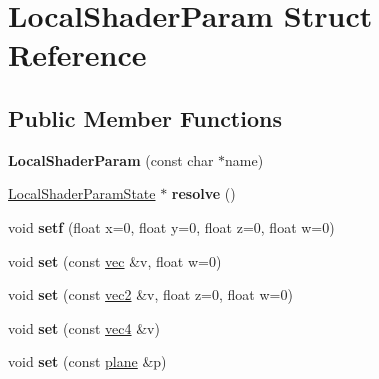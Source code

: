 \hypertarget{struct_local_shader_param}{}\section{Local\+Shader\+Param Struct Reference}
\label{struct_local_shader_param}
\subsection*{Public Member Functions}
\begin{DoxyCompactItemize}
\item 
\mbox{\label{struct_local_shader_param_a1acdf1fcdef3d9c7f2fe238dcda4db07}} 
{\bfseries Local\+Shader\+Param} (const char $\ast$name)
\item 
\mbox{\label{struct_local_shader_param_a43b2c7c2c7a174fc2c4a3f5ba18cc114}} 
\hyperlink{struct_local_shader_param_state}{Local\+Shader\+Param\+State} $\ast$ {\bfseries resolve} ()
\item 
\mbox{\label{struct_local_shader_param_ada3322bb528ea4f4e191c9e42602cecd}} 
void {\bfseries setf} (float x=0, float y=0, float z=0, float w=0)
\item 
\mbox{\label{struct_local_shader_param_aab97027a7f88630ebf8e0127286b0299}} 
void {\bfseries set} (const \hyperlink{structvec}{vec} \&v, float w=0)
\item 
\mbox{\label{struct_local_shader_param_a2a8c3fd8f347f10988bec128154fbc12}} 
void {\bfseries set} (const \hyperlink{structvec2}{vec2} \&v, float z=0, float w=0)
\item 
\mbox{\label{struct_local_shader_param_a3f567c8613a7108c751d1effcee768e8}} 
void {\bfseries set} (const \hyperlink{structvec4}{vec4} \&v)
\item 
\mbox{\label{struct_local_shader_param_a05a64a545757bfa643d20b66e711458f}} 
void {\bfseries set} (const \hyperlink{structplane}{plane} \&p)
\item 
\mbox{\label{struct_local_shader_param_ab37c98ca611d746ce8d6000341456244}} 

\end{DoxyCompactItemize}
